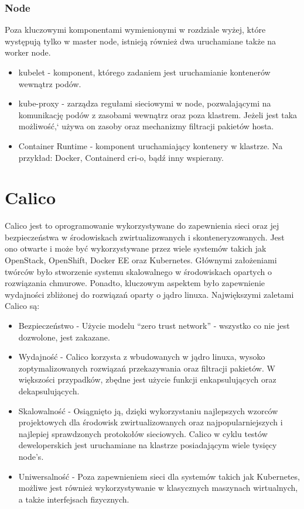 \documentclass[pl,final,oneside]{mgr} %
\begin{document}
\subsubsection{Node}
Poza kluczowymi komponentami wymienionymi w rozdziale wyżej, które występują tylko w master node, istnieją również dwa uruchamiane także na worker node.
\begin{itemize}
	\item kubelet - komponent, którego zadaniem jest uruchamianie kontenerów wewnątrz podów. 
	\item kube-proxy - zarządza regułami sieciowymi w node, pozwalającymi na komunikację podów z zasobami wewnątrz oraz poza klastrem. Jeżeli jest taka możliwość,` używa on zasoby oraz mechanizmy filtracji pakietów hosta.
	\item Container Runtime - komponent uruchamiający kontenery w klastrze. Na przykład: Docker, Containerd cri-o, bądź inny wspierany.
\end{itemize}



\section{Calico}
Calico jest to oprogramowanie wykorzystywane do zapewnienia sieci oraz jej bezpieczeństwa w środowiskach zwirtualizowanych i skonteneryzowanych. Jest ono otwarte i może być wykorzystywane przez wiele systemów takich jak OpenStack, OpenShift, Docker EE oraz Kubernetes. Głównymi założeniami twórców było stworzenie systemu skalowalnego w środowiskach opartych o rozwiązania chmurowe. Ponadto, kluczowym aspektem było zapewnienie wydajności zbliżonej do rozwiązań oparty o jądro linuxa. Największymi zaletami Calico są:
\begin{itemize}
	\item Bezpieczeństwo - Użycie modelu “zero trust network” - wszystko co nie jest dozwolone, jest zakazane.
	\item Wydajność - Calico korzysta z wbudowanych w jądro linuxa, wysoko zoptymalizowanych rozwiązań przekazywania oraz filtracji pakietów. W większości przypadków, zbędne jest użycie funkcji enkapsulujących oraz dekapsulujących.
	\item Skalowalność - Osiągnięto ją, dzięki wykorzystaniu najlepszych wzorców projektowych dla środowisk zwirtualizowanych oraz najpopularniejszych i najlepiej sprawdzonych protokołów sieciowych. Calico w cyklu testów deweloperskich jest uruchamiane na klastrze posiadającym wiele tysięcy node’s. 
	\item Uniwersalność - Poza zapewnieniem sieci dla systemów takich jak Kubernetes, możliwe jest również wykorzystywanie w klasycznych maszynach wirtualnych, a także interfejsach fizycznych.
\end{itemize}
\end{document}

